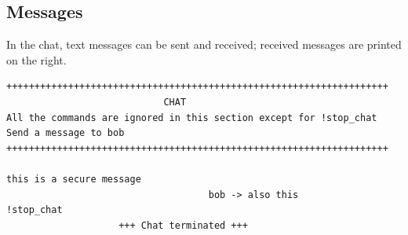 \documentclass[11pt]{report}
\begin{document}
\subsection*{Messages}
In the chat, text messages can be sent and received; received messages are printed on the right.
\begin{lstlisting}
++++++++++++++++++++++++++++++++++++++++++++++++++++++++++++++++++++
                            CHAT                                   
All the commands are ignored in this section except for !stop_chat 
Send a message to bob
++++++++++++++++++++++++++++++++++++++++++++++++++++++++++++++++++++ 

this is a secure message
                                    bob -> also this
!stop_chat			
                    +++ Chat terminated +++
\end{lstlisting}

	
	
		

	

	

\end{document}

